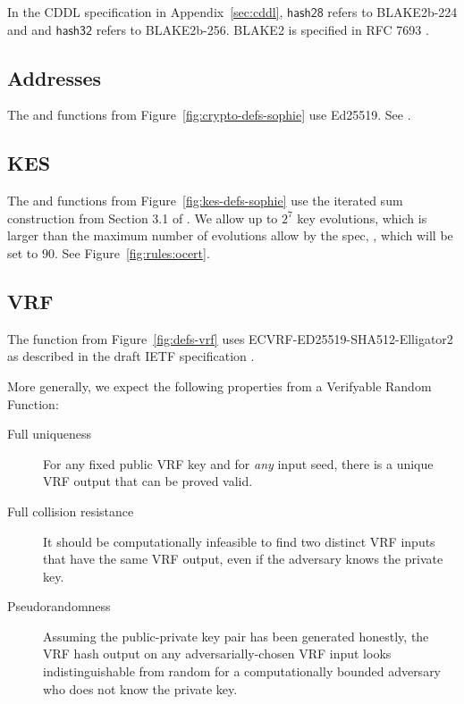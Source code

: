 In the CDDL specification in Appendix~\ref{sec:cddl},
$\mathsf{hash28}$ refers to BLAKE2b-224 and
and $\mathsf{hash32}$ refers to BLAKE2b-256.
BLAKE2 is specified in RFC 7693 \cite{rfcBLAKE2}.

\subsection{Addresses}
\label{sec:app-addresses}
The  and  functions from Figure~\ref{fig:crypto-defs-sophie}
use Ed25519. See \cite{rfcEdDSA}.

\subsection{KES}
The  and  functions from Figure~\ref{fig:kes-defs-sophie}
use the iterated sum construction from Section 3.1 of \cite{cryptoeprint:2001:034}.
We allow up to $2^7$ key evolutions, which is larger than the maximum number
of evolutions allow by the spec, \MaxKESEvo, which will be set to $90$.
See Figure~\ref{fig:rules:ocert}.

\subsection{VRF}
\label{sec:app-vrf}
The  function from Figure~\ref{fig:defs-vrf}
uses ECVRF-ED25519-SHA512-Elligator2 as described in the draft IETF specification
\cite{rfcVRFDraft}.

More generally, we expect the following properties from a Verifyable Random Function: 
\begin{description}
\item[Full uniqueness] For any fixed public VRF key and for \textit{any} input seed, there is a unique VRF output that can be proved valid. 
\item[Full collision resistance] It should be computationally infeasible to find two distinct VRF inputs that have the same VRF output, even if the adversary knows the private key. 
\item[Pseudorandomness] Assuming the public-private key pair has been generated honestly, the VRF hash output on any adversarially-chosen VRF input looks indistinguishable from random for a computationally bounded adversary who does not know the private key. 
\end{description}

